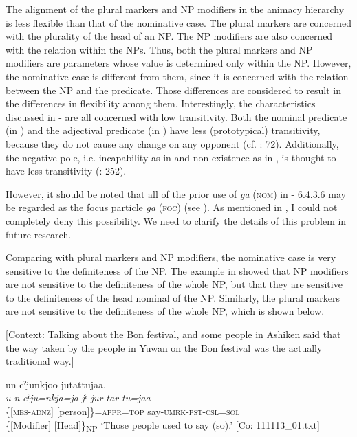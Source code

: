 The alignment of the plural markers and NP modifiers in the animacy hierarchy is less flexible than that of the nominative case. The plural markers are concerned with the plurality of the head of an NP. The NP modifiers are also concerned with the relation within the NPs. Thus, both the plural markers and NP modifiers are parameters whose value is determined only within the NP. However, the nominative case is different from them, since it is concerned with the relation between the NP and the predicate. Those differences are considered to result in the differences in flexibility among them. Interestingly, the characteristics discussed in  -  are all concerned with low transitivity. Both the nominal predicate (in ) and the adjectival predicate (in ) have less (prototypical) transitivity, because they do not cause any change on any opponent (cf. \citealt{Tsunoda1991}: 72). Additionally, the negative pole, i.e. incapability as in  and non-existence as in , is thought to have less transitivity (\citealt{HopperThompson1980}: 252).

However, it should be noted that all of the prior use of \textit{ga} (\textsc{nom}) in  - 6.4.3.6 may be regarded as the focus particle \textit{ga} (\textsc{foc}) (see ). As mentioned in , I could not completely deny this possibility. We need to clarify the details of this problem in future research.

Comparing with plural markers and NP modifiers, the nominative case is very sensitive to the definiteness of the NP. The example  in  showed that NP modifiers are not sensitive to the definiteness of the whole NP, but that they are sensitive to the definiteness of the head nominal of the NP. Similarly, the plural markers are not sensitive to the definiteness of the whole NP, which is shown below.

\ea\label{ex:6-137}
  [Context: Talking about the Bon festival, and some people in Ashiken said that the way taken by the people in Yuwan on the Bon festival was the actually traditional way.]

{\TM}
\glll un  cˀjunkjoo  jutattujaa.\\
\textit{u-n}  \textit{cˀju=nkja=ja}  \textit{jˀ-jur-tar-tu=jaa}\\
    \{[\textsc{mes}-\textsc{adnz}]  [person]\}=\textsc{appr}=\textsc{top}  say-\textsc{umrk}-\textsc{pst}-\textsc{csl}=\textsc{sol}\\
    \{[Modifier]  [Head]\}\textsubscript{NP}  
\glt    ‘Those people used to say (so).’ [Co: 111113\_01.txt]
\z

